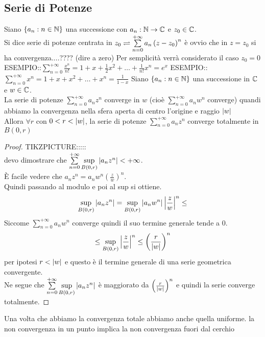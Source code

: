 \subsection{Serie di Potenze}
\begin{exercise} %
	\label{ex:conv_ser_piu_var}
\end{exercise}
Siano $\left\{a_n:n\in\mathbb{N}\right\}$ una successione con $a_n:\mathbb{N}\to\mathbb{C}$ e $z_0\in\mathbb{C}$.\\
Si dice serie di potenze centrata in $z_0 \rightleftharpoons \sum\limits_{n=0}^{+\infty}a_n\left(z-z_0\right)^n$
\observation
è ovvio che in $z=z_0$ si ha convergenza....???? (dire a zero)
\observation
Per semplicità verrà considerato il caso $z_0=0$
ESEMPIO::$\sum\limits_{n=0}^{+\infty}\frac{x^n}{n!}=1+x+\frac{1}{2} x^2+\ldots+\frac{1}{n!}x^n=e^x$
ESEMPIO::$\sum\limits_{n=0}^{+\infty}x^n=1+x+x^2+\ldots+x^n=\frac{1}{1-x}$
\proposition
Siano $\left\{a_n:n\in\mathbb{N}\right\}$ una successione in $\mathbb{C}$ e $w\in\mathbb{C}$.\\
La serie di potenze $\sum\limits_{n=0}^{+\infty}a_nz^n$ converge in $w$ (cioè $\sum\limits_{n=0}^{+\infty}a_nw^n$ converge) quandi abbiamo la convergenza nella sfera aperta di centro l'origine e raggio $\left|w\right|$\\
Allora $\forall r$ con $0<r<\left|w\right|$, la serie di potenze $\sum\limits_{n=0}^{+\infty}a_nz^n$ converge totalmente in $B(0,r)$
\begin{proof}
	TIKZPICTURE:::::\\
	devo dimostrare che $\sum\limits_{n=0}^{+\infty}\sup\limits_{B(0,r)}\left|a_nz^n\right|<+\infty$.\\
	È facile vedere che $a_nz^n=a_nw^n\left(\frac{z}{w}\right)^n$.\\
	Quindi passando al modulo e poi al sup si ottiene.
	\[\sup\limits_{B(0,r)}\left|a_nz^n\right|=\sup\limits_{B(0,r)}\left|a_nw^n\right|\left|\frac{z}{w}\right|^n \leq \]
	Siccome $\sum\limits_{n=0}^{+\infty}a_nw^n$ converge  quindi il suo termine generale tende a $0$.
	\[ \leq \sup\limits_{B(0,r)}\left|\frac{z}{w}\right|^n \leq \left(\frac{r}{\left|w\right|}\right)^n \]
	per ipotesi $r<\left|w\right|$ e questo è il termine generale di una serie geometrica convergente.\\
	Ne segue che $\sum\limits_{n=0}^{+\infty}\sup\limits_{B(0,r)}\left|a_nz^n\right|$ è maggiorato da $\left( \frac{r}{\left|w\right|}\right)^n$ e quindi la serie converge totalmente.
\end{proof}
\observation
Una volta che abbiamo la convergenza totale abbiamo anche quella uniforme.
\proposition la non convergenza in un punto implica la non convergenza fuori dal cerchio\\
